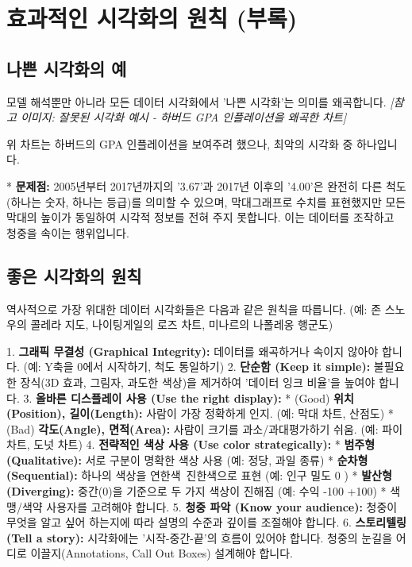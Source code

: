 \documentclass[11pt,a4paper]{book}
\theoremstyle{definition}
\begin{document}
\section{효과적인 시각화의 원칙 (부록)}

\subsection{나쁜 시각화의 예}

모델 해석뿐만 아니라 모든 데이터 시각화에서 '나쁜 시각화'는 의미를 왜곡합니다.
\textit{[참고 이미지: 잘못된 시각화 예시 - 하버드 GPA 인플레이션을 왜곡한 차트]}

위 차트는 하버드의 GPA 인플레이션을 보여주려 했으나, 최악의 시각화 중 하나입니다.

* \textbf{문제점:} 2005년부터 2017년까지의 '3.67'과 2017년 이후의 '4.00'은 완전히 다른 척도(하나는 숫자, 하나는 등급)를 의미할 수 있으며, 막대그래프로 수치를 표현했지만 모든 막대의 높이가 동일하여 시각적 정보를 전혀 주지 못합니다. 이는 데이터를 조작하고 청중을 속이는 행위입니다.

\subsection{좋은 시각화의 원칙}

역사적으로 가장 위대한 데이터 시각화들은 다음과 같은 원칙을 따릅니다.
(예: 존 스노우의 콜레라 지도, 나이팅게일의 로즈 차트, 미나르의 나폴레옹 행군도)

1.  \textbf{그래픽 무결성 (Graphical Integrity):} 데이터를 왜곡하거나 속이지 않아야 합니다. (예: Y축을 0에서 시작하기, 척도 통일하기)
2.  \textbf{단순함 (Keep it simple):} 불필요한 장식(3D 효과, 그림자, 과도한 색상)을 제거하여 '데이터 잉크 비율'을 높여야 합니다.
3.  \textbf{올바른 디스플레이 사용 (Use the right display):}
    * (Good) \textbf{위치(Position), 길이(Length):} 사람이 가장 정확하게 인지. (예: 막대 차트, 산점도)
    * (Bad) \textbf{각도(Angle), 면적(Area):} 사람이 크기를 과소/과대평가하기 쉬움. (예: 파이 차트, 도넛 차트)
4.  \textbf{전략적인 색상 사용 (Use color strategically):}
    * \textbf{범주형(Qualitative):} 서로 구분이 명확한 색상 사용 (예: 정당, 과일 종류)
    * \textbf{순차형(Sequential):} 하나의 색상을 연한색~진한색으로 표현 (예: 인구 밀도 0 )
    * \textbf{발산형(Diverging):} 중간(0)을 기준으로 두 가지 색상이 진해짐 (예: 수익 -100  \to +100)
    * 색맹/색약 사용자를 고려해야 합니다.
5.  \textbf{청중 파악 (Know your audience):} 청중이 무엇을 알고 싶어 하는지에 따라 설명의 수준과 깊이를 조절해야 합니다.
6.  \textbf{스토리텔링 (Tell a story):} 시각화에는 '시작-중간-끝'의 흐름이 있어야 합니다. 청중의 눈길을 어디로 이끌지(Annotations, Call Out Boxes) 설계해야 합니다.
\end{document}
